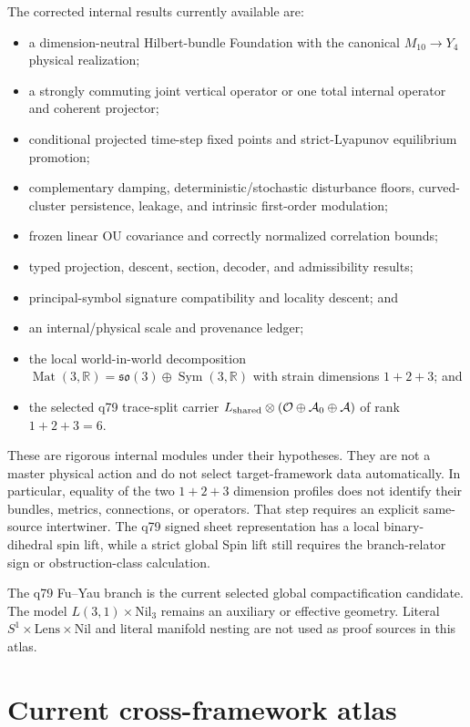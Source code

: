 \documentclass[11pt]{article}
\begin{document}
The corrected internal results currently available are:
\begin{itemize}
\item a dimension-neutral Hilbert-bundle Foundation with the canonical
$M_{10}\to Y_4$ physical realization;
\item a strongly commuting joint vertical operator or one total internal
operator and coherent projector;
\item conditional projected time-step fixed points and strict-Lyapunov
equilibrium promotion;
\item complementary damping, deterministic/stochastic disturbance floors,
curved-cluster persistence, leakage, and intrinsic first-order modulation;
\item frozen linear OU covariance and correctly normalized correlation bounds;
\item typed projection, descent, section, decoder, and admissibility results;
\item principal-symbol signature compatibility and locality descent; and
\item an internal/physical scale and provenance ledger;
\item the local world-in-world decomposition
$\operatorname{Mat}(3,\mathbb R)=\mathfrak{so}(3)\oplus
\operatorname{Sym}(3,\mathbb R)$ with strain dimensions $1+2+3$; and
\item the selected q79 trace-split carrier
$L_{\rm shared}\otimes(\mathcal O\oplus\mathcal A_0\oplus\mathcal A)$
of rank $1+2+3=6$.
\end{itemize}

These are rigorous internal modules under their hypotheses. They are not a
master physical action and do not select target-framework data automatically.
In particular, equality of the two $1+2+3$ dimension profiles does not identify
their bundles, metrics, connections, or operators. That step requires an
explicit same-source intertwiner. The q79 signed sheet representation has a
local binary-dihedral spin lift, while a strict global Spin lift still requires
the branch-relator sign or obstruction-class calculation.

The q79 Fu--Yau branch is the current selected global compactification
candidate. The model $L(3,1)\times\mathrm{Nil}_3$ remains an auxiliary or
effective geometry. Literal $S^1\times\mathrm{Lens}\times\mathrm{Nil}$ and
literal manifold nesting are not used as proof sources in this atlas.

\section{Current cross-framework atlas}
\end{document}
